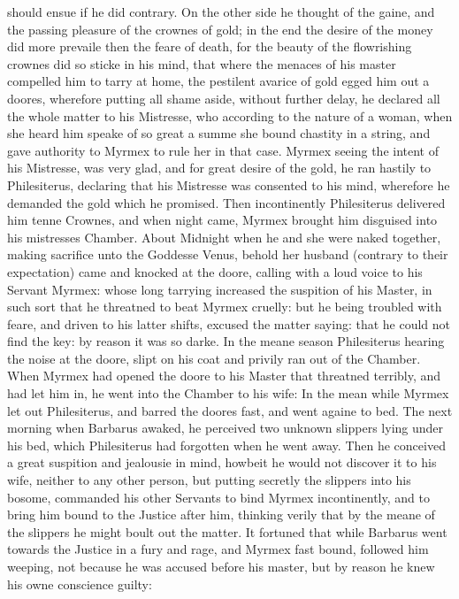 should ensue if he did contrary. On the other side he thought of the gaine, and
the passing pleasure of the crownes of gold; in the end the desire of the money
did more prevaile then the feare of death, for the beauty of the flowrishing
crownes did so sticke in his mind, that where the menaces of his master
compelled him to tarry at home, the pestilent avarice of gold egged him out a
doores, wherefore putting all shame aside, without further delay, he declared
all the whole matter to his Mistresse, who according to the nature of a woman,
when she heard him speake of so great a summe she bound chastity in a string,
and gave authority to Myrmex to rule her in that case. Myrmex seeing the intent
of his Mistresse, was very glad, and for great desire of the gold, he ran
hastily to Philesiterus, declaring that his Mistresse was consented to his
mind, wherefore he demanded the gold which he promised. Then incontinently
Philesiterus delivered him tenne Crownes, and when night came, Myrmex brought
him disguised into his mistresses Chamber. About Midnight when he and she were
naked together, making sacrifice unto the Goddesse Venus, behold her husband
(contrary to their expectation) came and knocked at the doore, calling with a
loud voice to his Servant Myrmex: whose long tarrying increased the suspition
of his Master, in such sort that he threatned to beat Myrmex cruelly: but he
being troubled with feare, and driven to his latter shifts, excused the matter
saying: that he could not find the key: by reason it was so darke. In the meane
season Philesiterus hearing the noise at the doore, slipt on his coat and
privily ran out of the Chamber. When Myrmex had opened the doore to his Master
that threatned terribly, and had let him in, he went into the Chamber to his
wife: In the mean while Myrmex let out Philesiterus, and barred the doores
fast, and went againe to bed. The next morning when Barbarus awaked, he
perceived two unknown slippers lying under his bed, which Philesiterus had
forgotten when he went away. Then he conceived a great suspition and jealousie
in mind, howbeit he would not discover it to his wife, neither to any other
person, but putting secretly the slippers into his bosome, commanded his other
Servants to bind Myrmex incontinently, and to bring him bound to the Justice
after him, thinking verily that by the meane of the slippers he might boult out
the matter. It fortuned that while Barbarus went towards the Justice in a fury
and rage, and Myrmex fast bound, followed him weeping, not because he was
accused before his master, but by reason he knew his owne conscience guilty:
